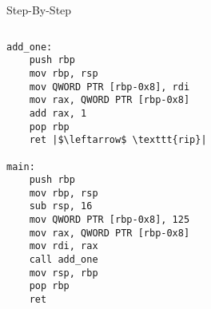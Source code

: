 \documentclass[hyphens,aspectratio=169]{beamer}
\begin{document}
\begin{frame}[fragile]{Step-By-Step}
    \begin{columns}
        \begin{column}{0.33\textwidth}
            \begin{verbatim}
add_one:
    push rbp
    mov rbp, rsp
    mov QWORD PTR [rbp-0x8], rdi
    mov rax, QWORD PTR [rbp-0x8]
    add rax, 1
    pop rbp
    ret |$\leftarrow$ \texttt{rip}|

main:
    push rbp
    mov rbp, rsp
    sub rsp, 16
    mov QWORD PTR [rbp-0x8], 125
    mov rax, QWORD PTR [rbp-0x8]
    mov rdi, rax
    call add_one
    mov rsp, rbp
    pop rbp
    ret
            \end{verbatim}
        \end{column}
        \begin{column}{0.33\textwidth}
\end{column}
\end{columns}
\end{frame}
\end{document}
